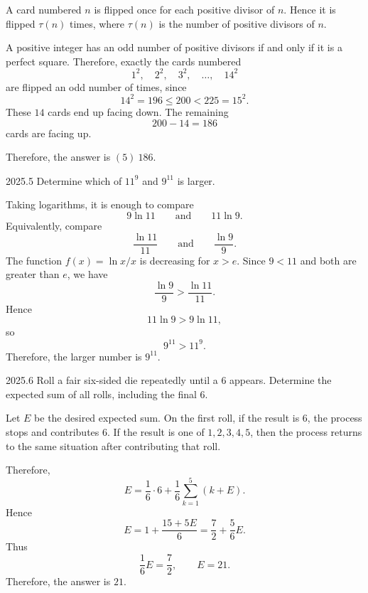     \begin{solution}
        A card numbered $n$ is flipped once for each positive divisor of $n$. Hence it is flipped
        $\tau(n)$ times, where $\tau(n)$ is the number of positive divisors of $n$.

        A positive integer has an odd number of positive divisors if and only if it is a perfect
        square. Therefore, exactly the cards numbered
        \[
            1^2,\quad 2^2,\quad 3^2,\quad \ldots,\quad 14^2
        \]
        are flipped an odd number of times, since
        \[
            14^2=196\leq 200<225=15^2.
        \]
        These $14$ cards end up facing down. The remaining
        \[
            200-14=186
        \]
        cards are facing up.

        Therefore, the answer is $\boxed{(5)\ 186}$.
    \end{solution}

    \begin{pastproblem}{2025.5}
        Determine which of $11^9$ and $9^{11}$ is larger.
    \end{pastproblem}

    \begin{solution}
        Taking logarithms, it is enough to compare
        \[
            9\ln 11
            \qquad\text{and}\qquad
            11\ln 9.
        \]
        Equivalently, compare
        \[
            \frac{\ln 11}{11}
            \qquad\text{and}\qquad
            \frac{\ln 9}{9}.
        \]
        The function $f(x)=\ln x/x$ is decreasing for $x>e$. Since $9<11$ and both are greater than
        $e$, we have
        \[
            \frac{\ln 9}{9}
            >
            \frac{\ln 11}{11}.
        \]
        Hence
        \[
            11\ln 9>9\ln 11,
        \]
        so
        \[
            9^{11}>11^9.
        \]
        Therefore, the larger number is $\boxed{9^{11}}$.
    \end{solution}

    \begin{pastproblem}{2025.6}
        Roll a fair six-sided die repeatedly until a $6$ appears. Determine the expected sum of all
        rolls, including the final $6$.
    \end{pastproblem}

    \begin{solution}
        Let $E$ be the desired expected sum. On the first roll, if the result is $6$, the process
        stops and contributes $6$. If the result is one of $1,2,3,4,5$, then the process returns to
        the same situation after contributing that roll.

        Therefore,
        \[
            E
            =
            \frac16\cdot 6
            +
            \frac16\sum_{k=1}^{5}(k+E).
        \]
        Hence
        \[
            E
            =
            1+\frac{15+5E}{6}
            =
            \frac72+\frac56E.
        \]
        Thus
        \[
            \frac16E=\frac72,
            \qquad
            E=21.
        \]
        Therefore, the answer is $\boxed{21}$.
    \end{solution}

